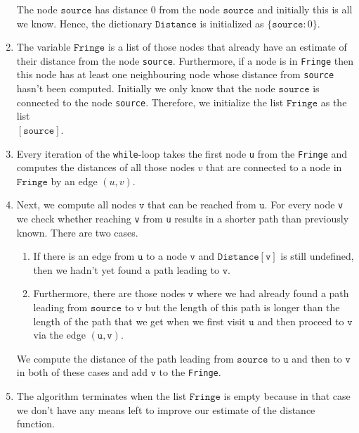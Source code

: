 \begin{enumerate}
      The node $\texttt{source}$ has distance $0$ from the node $\texttt{source}$ and initially this is
      all we know.  Hence, the dictionary $\texttt{Distance}$ is initialized as $\bigl\{\texttt{source}:0 \bigr\}$.
\item The variable $\texttt{Fringe}$ is a list of those nodes that already have an estimate of
      their distance from the  node \texttt{source}.  Furthermore, if a node is in \texttt{Fringe} then this
      node has at least one neighbouring node whose distance from \texttt{source} hasn't been computed. 
      Initially we only know that the node $\texttt{source}$ is connected to the node \texttt{source}.
      Therefore, we initialize the list $\texttt{Fringe}$ as the list
      \\[0.2cm]
      \hspace*{1.3cm}
      $[ \texttt{source} ]$.
\item Every iteration of the \texttt{while}-loop takes the first node \texttt{u} from the \texttt{Fringe} and computes the
      distances of all those nodes $v$ that are 
      connected to a node in $\texttt{Fringe}$ by an edge $(u,v)$.
\item Next, we compute all nodes $\texttt{v}$ that can be reached from $\texttt{u}$. For every node \texttt{v} we check whether 
      reaching \texttt{v} from \texttt{u} results in a shorter path than previously known.
      There are two cases.
      \begin{enumerate}
      \item If there is an edge from $\texttt{u}$ to a node $\texttt{v}$ and  $\texttt{Distance}[\texttt{v}]$ is still
            undefined, then we hadn't yet found a path leading to $\texttt{v}$.
      \item Furthermore, there are those nodes $\texttt{v}$ where we had already found a path leading from
            $\texttt{source}$ to $\texttt{v}$ but the length of this path is longer than the length of the path
            that we get when we first visit $\texttt{u}$ and then proceed to $\texttt{v}$ via the edge $(\texttt{u},\texttt{v})$.
      \end{enumerate}
      We compute the distance of the path leading from $\texttt{source}$ to $\texttt{u}$ and then to
      $\texttt{v}$ in both of these cases and add $\texttt{v}$ to the \texttt{Fringe}.
\item The algorithm terminates when the list $\texttt{Fringe}$ is empty because in that case we don't
      have any means left to improve our estimate of the distance function.
\end{enumerate}

